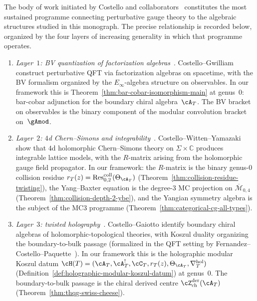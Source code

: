 The body of work initiated by Costello and
collaborators~\cite{CG17,CWY18,CostelloGaiotto2020,CL16,Costello2111,CostelloP2201,Costello2302,CPS2208,CPS2306,FernandezCostelloP24,BittlestonCostelloZeng24,BittlestonCostello25,CFG25}
constitutes the most sustained programme connecting perturbative
gauge theory to the algebraic structures studied in this monograph.
The precise relationship is recorded below, organized by the four
layers of increasing generality in which that programme operates.

\begin{remark}
\label{rem:costello-four-layers}

\begin{enumerate}[label=\textup{(\roman*)}]
\item \emph{Layer~$1$: BV quantization of factorization
 algebras}~\cite{CG17}.
 Costello--Gwilliam construct perturbative QFT
 via factorization algebras on spacetime, with the BV formalism
 organized by the $E_\infty$-algebra structure on observables.
 In our framework this is
 Theorem~\ref{thm:bar-cobar-isomorphism-main} at genus~$0$:
 bar-cobar adjunction for the boundary chiral algebra~$\cA_T$.
 The BV bracket on observables is the binary component of the
 modular convolution bracket on~$\gAmod$.

\item \emph{Layer~$2$: $4$d Chern--Simons and
 integrability}~\cite{CWY18}.
 Costello--Witten--Yamazaki show that $4$d holomorphic
 Chern--Simons theory on $\Sigma \times \mathbb{C}$ produces
 integrable lattice models, with the $R$-matrix arising from
 the holomorphic gauge field propagator. In our framework:
 the $R$-matrix is the binary genus-$0$ collision residue
 $r_T(z) = \operatorname{Res}^{\mathrm{coll}}_{0,2}(\Theta_{\cA_T})$
 (Theorem~\ref{thm:collision-residue-twisting}), the Yang--Baxter
 equation is the degree-$3$ MC projection on
 $\overline{\mathcal{M}}_{0,4}$
 (Theorem~\ref{thm:collision-depth-2-ybe}),
 and the Yangian symmetry algebra is the subject of the
 MC3 programme
 (Theorem~\ref{thm:categorical-cg-all-types}).

\item \emph{Layer~$3$: twisted
 holography}~\cite{CostelloGaiotto2020,Costello-1705.02500v1,FernandezCostelloP24}.
 Costello--Gaiotto identify boundary chiral algebras of
 holomorphic-topological theories, with Koszul duality
 organizing the boundary-to-bulk passage
 (formalized in the QFT setting
 by Fernandez--Costello--Paquette~\cite{FernandezCostelloP24}). In our framework
 this is the holographic modular Koszul datum
 $\cH(T) = (\cA_T, \cA_T^!, \cC_T, r_T(z),
 \Theta_{\cA_T}, \nabla^{\mathrm{hol}}_T)$
 (Definition~\ref{def:holographic-modular-koszul-datum})
 at genus~$0$. The boundary-to-bulk passage
 is the chiral derived centre
 $\cZ^{\mathrm{der}}_{\mathrm{ch}}(\cA_T)$
 (Theorem~\ref{thm:thqg-swiss-cheese}).


\end{enumerate}
\end{remark}
